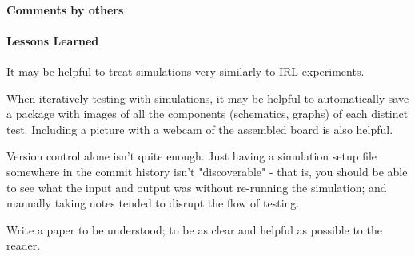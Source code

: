 \documentclass[fleqn,10pt]{article}
\begin{document}
\begin{multicols}{1}
\paragraph{Comments by others}

\paragraph{Lessons Learned}

It may be helpful to treat simulations very similarly to IRL experiments. 

When iteratively testing with simulations, it may be helpful to automatically save a package with images of all the components (schematics, graphs) of each distinct test. Including a picture with a webcam of the assembled board is also helpful. 

Version control alone isn't quite enough. Just having a simulation setup file somewhere in the commit history isn't "discoverable" - that is, you should be able to see what the input and output was without re-running the simulation; and manually taking notes tended to disrupt the flow of testing.



Write a paper to be understood; to be as clear and helpful as possible to the reader.



\end{multicols}
\end{document}
